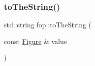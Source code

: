 \mbox{\label{namespacefop_a6e88eff251cad9a76ad0c171c60ee230}} 
\subsubsection{\texorpdfstring{to\+The\+String()}{toTheString()}\hspace{0.1cm}{\footnotesize\ttfamily [2/2]}}
{\footnotesize\ttfamily std\+::string fop\+::to\+The\+String (\begin{DoxyParamCaption}\item[{const \mbox{\hyperlink{classfop_1_1_figure}{Figure}} \&}]{value }\end{DoxyParamCaption})}

